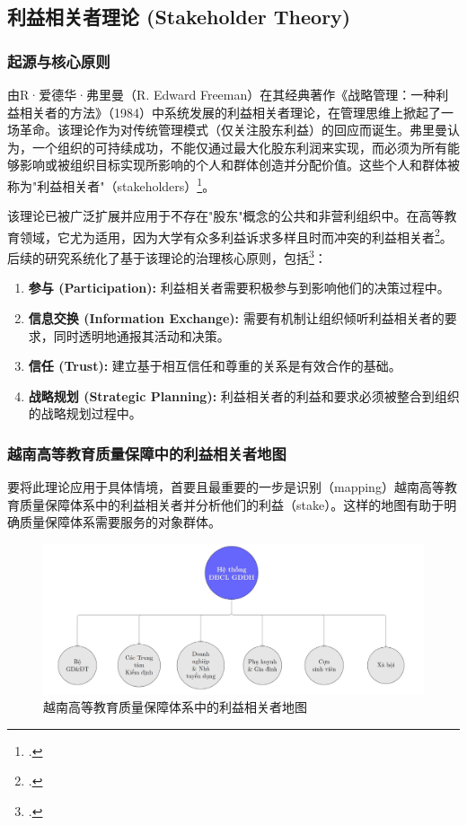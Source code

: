 \subsection{利益相关者理论 (Stakeholder Theory)}
\label{subsec:ben_lien_quan_nen_tang}

\subsubsection{起源与核心原则}

由R·爱德华·弗里曼（R. Edward Freeman）在其经典著作《战略管理：一种利益相关者的方法》（1984）中系统发展的利益相关者理论，在管理思维上掀起了一场革命。该理论作为对传统管理模式（仅关注股东利益）的回应而诞生。弗里曼认为，一个组织的可持续成功，不能仅通过最大化股东利润来实现，而必须为所有能够影响或被组织目标实现所影响的个人和群体创造并分配价值。这些个人和群体被称为"利益相关者"（stakeholders）\footcite{Freeman1984}。

该理论已被广泛扩展并应用于不存在"股东"概念的公共和非营利组织中。在高等教育领域，它尤为适用，因为大学有众多利益诉求多样且时而冲突的利益相关者\footcite{Langrafe2020}。后续的研究系统化了基于该理论的治理核心原则，包括\footcite{LangrafeEUR2020}：
\begin{enumerate}
    \item \textbf{参与 (Participation):} 利益相关者需要积极参与到影响他们的决策过程中。
    \item \textbf{信息交换 (Information Exchange):} 需要有机制让组织倾听利益相关者的要求，同时透明地通报其活动和决策。
    \item \textbf{信任 (Trust):} 建立基于相互信任和尊重的关系是有效合作的基础。
    \item \textbf{战略规划 (Strategic Planning):} 利益相关者的利益和要求必须被整合到组织的战略规划过程中。
\end{enumerate}

\subsubsection{越南高等教育质量保障中的利益相关者地图}

要将此理论应用于具体情境，首要且最重要的一步是识别（mapping）越南高等教育质量保障体系中的利益相关者并分析他们的利益（stake）。这样的地图有助于明确质量保障体系需要服务的对象群体。
\begin{figure}[h!]
    \centering
    \includegraphics[width=\textwidth]{image/stakeholder_map.jpg} 
    \caption{越南高等教育质量保障体系中的利益相关者地图}
    \label{fig:stakeholder-map}
\end{figure}

